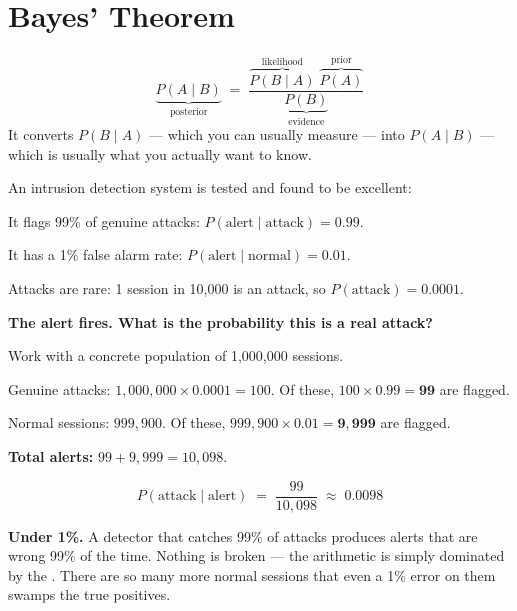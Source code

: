 \section{Bayes' Theorem}

\begin{definitionbox}
\[
\underbrace{P(A \mid B)}_{\text{posterior}}
\;=\;
\frac{\overbrace{P(B \mid A)}^{\text{likelihood}} \; \overbrace{P(A)}^{\text{prior}}}
     {\underbrace{P(B)}_{\text{evidence}}}
\]
It converts $P(B \mid A)$ --- which you can usually measure --- into
$P(A \mid B)$ --- which is usually what you actually want to know.
\end{definitionbox}

\begin{worked}
An intrusion detection system is tested and found to be excellent:
\begin{tight}
  \item It flags 99\% of genuine attacks: $P(\text{alert} \mid \text{attack}) = 0.99$.
  \item It has a 1\% false alarm rate: $P(\text{alert} \mid \text{normal}) = 0.01$.
\end{tight}
Attacks are rare: 1 session in 10{,}000 is an attack, so $P(\text{attack}) = 0.0001$.

\smallskip
\textbf{The alert fires. What is the probability this is a real attack?}

\smallskip
Work with a concrete population of 1{,}000{,}000 sessions.
\begin{tight}
  \item Genuine attacks: $1{,}000{,}000 \times 0.0001 = 100$.
        Of these, $100 \times 0.99 = \mathbf{99}$ are flagged.
  \item Normal sessions: $999{,}900$.
        Of these, $999{,}900 \times 0.01 = \mathbf{9{,}999}$ are flagged.
\end{tight}

\textbf{Total alerts:} $99 + 9{,}999 = 10{,}098$.

\[
P(\text{attack} \mid \text{alert}) \;=\; \frac{99}{10{,}098} \;\approx\; 0.0098
\]

\smallskip
\textbf{Under 1\%.} A detector that catches 99\% of attacks produces alerts that
are wrong 99\% of the time. Nothing is broken --- the arithmetic is simply
dominated by the . There are so many more normal sessions that even
a 1\% error on them swamps the true positives.


\end{worked}
